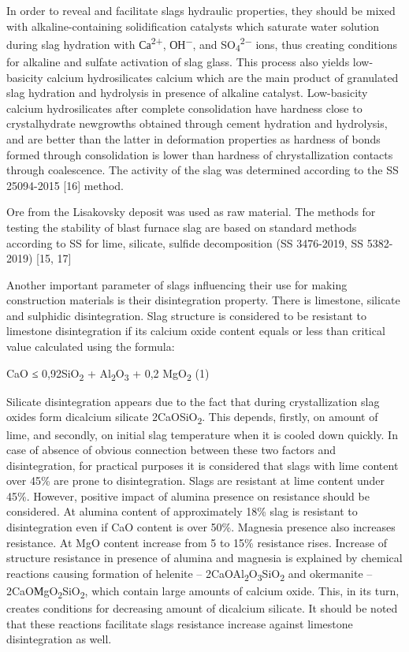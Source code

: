 In order to reveal and facilitate slags\textquotesingle{} hydraulic
properties, they should be mixed with alkaline-containing solidification
catalysts which saturate water solution during slag hydration with
Са\textsuperscript{2+}, ОН\textsuperscript{−}, and
SO\textsubscript{4}\textsuperscript{2−} ions, thus creating conditions
for alkaline and sulfate activation of slag glass. This process also
yields low-basicity calcium hydrosilicates calcium which are the main
product of granulated slag hydration and hydrolysis in presence of
alkaline catalyst. Low-basicity calcium hydrosilicates after complete
consolidation have hardness close to crystalhydrate newgrowths obtained
through cement hydration and hydrolysis, and are better than the latter
in deformation properties as hardness of bonds formed through
consolidation is lower than hardness of chrystallization contacts
through coalescence. The activity of the slag was determined according
to the SS 25094-2015 {[}16{]} method.

Ore from the Lisakovsky deposit was used as raw material. The methods
for testing the stability of blast furnace slag are based on standard
methods according to SS for lime, silicate, sulfide decomposition (SS
3476-2019, SS 5382-2019) {[}15, 17{]}

Another important parameter of slags influencing their use for making
construction materials is their disintegration property. There is
limestone, silicate and sulphidic disintegration. Slag structure is
considered to be resistant to limestone disintegration if its calcium
oxide content equals or less than critical value calculated using the
formula:

CaO ≤ 0,92SiO\textsubscript{2} + Al\textsubscript{2}O\textsubscript{3} +
0,2 MgO\textsubscript{2} (1)

Silicate disintegration appears due to the fact that during
crystallization slag oxides form dicalcium silicate
2CaOSiO\textsubscript{2}. This depends, firstly, on amount of lime, and
secondly, on initial slag temperature when it is cooled down quickly. In
case of absence of obvious connection between these two factors and
disintegration, for practical purposes it is considered that slags with
lime content over 45\% are prone to disintegration. Slags are resistant
at lime content under 45\%. However, positive impact of alumina presence
on resistance should be considered. At alumina content of approximately
18\% slag is resistant to disintegration even if CaO content is over
50\%. Magnesia presence also increases resistance. At MgO content
increase from 5 to 15\% resistance rises. Increase of structure
resistance in presence of alumina and magnesia is explained by chemical
reactions causing formation of helenite --
2CaOAl\textsubscript{2}O\textsubscript{3}SiO\textsubscript{2} and
okermanite -- 2CaOМgO\textsubscript{2}SiO\textsubscript{2}, which
contain large amounts of calcium oxide. This, in its turn, creates
conditions for decreasing amount of dicalcium silicate. It should be
noted that these reactions facilitate slags resistance increase against
limestone disintegration as well.

